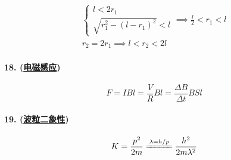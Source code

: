 \begin{gather*}
    \begin{cases}
        l<2r_1\\
        \sqrt{r_1^2-(l-r_1)^2}<l
    \end{cases}\implies
    \frac{l}{2}<r_1<l\\
    r_2=2r_1\implies
    l<r_2<2l
\end{gather*}

\paragraph{18. (\hyperref[subsec:电磁感应]{电磁感应})}

\begin{equation*}
    F=IBl=\frac{V}{R}Bl=\frac{\Delta B}{\Delta t}BSl
\end{equation*}

\paragraph{19. (\hyperref[sec:波粒二象性]{波粒二象性})}

\begin{equation*}
    K=\frac{p^2}{2m}\xlongequal{\lambda=h/p}\frac{h^2}{2m\lambda^2}
\end{equation*}
